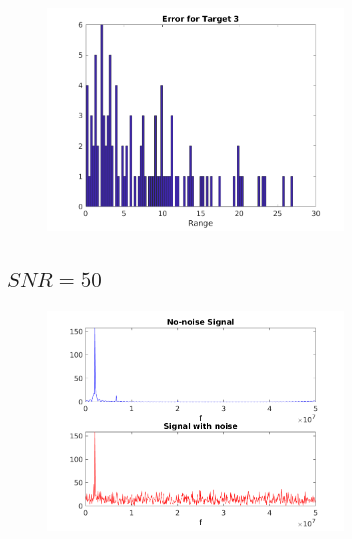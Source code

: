 \documentclass[a4paper,11pt]{article}
\begin{document}
\begin{figure}[!hp]
    \begin{center}
      \includegraphics[width=0.7\textwidth]{images/hist_e3_10.png}
    \end{center}
\end{figure}

\newpage

\subsection{$SNR = 50$}

\begin{figure}[!hp]
    \begin{center}
      \includegraphics[width=0.7\textwidth]{images/signals_50.png}
    \end{center}
\end{figure}
\end{document}

